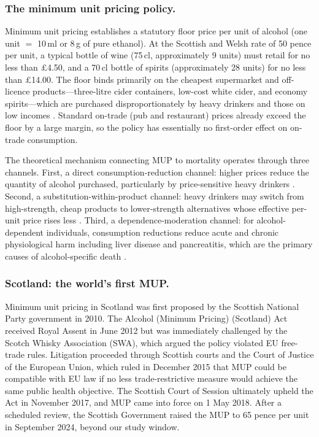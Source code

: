 \documentclass[12pt]{article}
\begin{document}
\subsubsection*{The minimum unit pricing policy.} Minimum unit pricing establishes a statutory floor price per unit of alcohol (one unit $=$ 10\,ml or 8\,g of pure ethanol). At the Scottish and Welsh rate of 50 pence per unit, a typical bottle of wine (75\,cl, approximately 9 units) must retail for no less than \pounds{}4.50, and a 70\,cl bottle of spirits (approximately 28 units) for no less than \pounds{}14.00. The floor binds primarily on the cheapest supermarket and off-licence products---three-litre cider containers, low-cost white cider, and economy spirits---which are purchased disproportionately by heavy drinkers and those on low incomes \citep{Stockwell2012,Griffith2022}. Standard on-trade (pub and restaurant) prices already exceed the floor by a large margin, so the policy has essentially no first-order effect on on-trade consumption.

The theoretical mechanism connecting MUP to mortality operates through three channels. First, a direct consumption-reduction channel: higher prices reduce the quantity of alcohol purchased, particularly by price-sensitive heavy drinkers \citep{Wagenaar2009,Meng2014}. Second, a substitution-within-product channel: heavy drinkers may switch from high-strength, cheap products to lower-strength alternatives whose effective per-unit price rises less \citep{Pryce2019}. Third, a dependence-moderation channel: for alcohol-dependent individuals, consumption reductions reduce acute and chronic physiological harm including liver disease and pancreatitis, which are the primary causes of alcohol-specific death \citep{Shield2013}.

\subsubsection*{Scotland: the world's first MUP.} Minimum unit pricing in Scotland was first proposed by the Scottish National Party government in 2010. The Alcohol (Minimum Pricing) (Scotland) Act received Royal Assent in June 2012 but was immediately challenged by the Scotch Whisky Association (SWA), which argued the policy violated EU free-trade rules. Litigation proceeded through Scottish courts and the Court of Justice of the European Union, which ruled in December 2015 that MUP could be compatible with EU law if no less trade-restrictive measure would achieve the same public health objective. The Scottish Court of Session ultimately upheld the Act in November 2017, and MUP came into force on 1 May 2018. After a scheduled review, the Scottish Government raised the MUP to 65 pence per unit in September 2024, beyond our study window.
\end{document}

